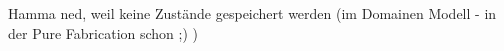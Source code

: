 

Hamma ned, weil keine Zustände gespeichert werden (im Domainen Modell - in der Pure Fabrication schon ;) )


